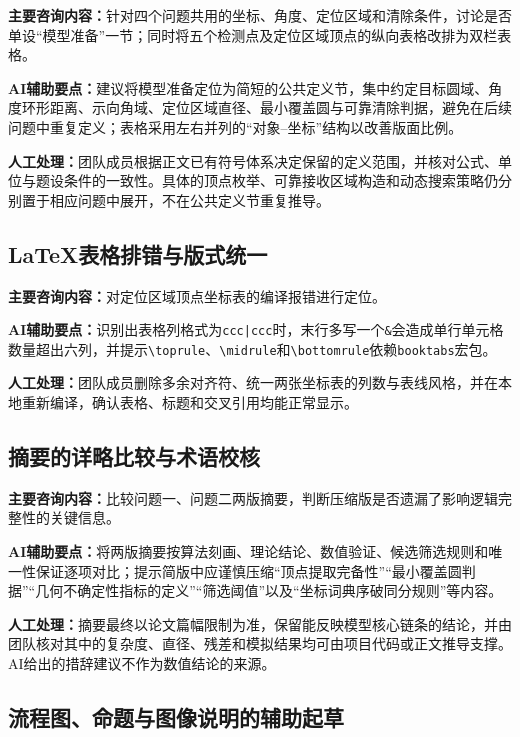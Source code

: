 \documentclass[12pt,a4paper]{article}
\begin{document}
\textbf{主要咨询内容：}针对四个问题共用的坐标、角度、定位区域和清除条件，讨论是否单设“模型准备”一节；同时将五个检测点及定位区域顶点的纵向表格改排为双栏表格。

\textbf{AI辅助要点：}建议将模型准备定位为简短的公共定义节，集中约定目标圆域、角度环形距离、示向角域、定位区域直径、最小覆盖圆与可靠清除判据，避免在后续问题中重复定义；表格采用左右并列的“对象--坐标”结构以改善版面比例。

\textbf{人工处理：}团队成员根据正文已有符号体系决定保留的定义范围，并核对公式、单位与题设条件的一致性。具体的顶点枚举、可靠接收区域构造和动态搜索策略仍分别置于相应问题中展开，不在公共定义节重复推导。

\subsection{LaTeX表格排错与版式统一}

\textbf{主要咨询内容：}对定位区域顶点坐标表的编译报错进行定位。

\textbf{AI辅助要点：}识别出表格列格式为\texttt{ccc|ccc}时，末行多写一个\texttt{\&}会造成单行单元格数量超出六列，并提示\texttt{\textbackslash toprule}、\texttt{\textbackslash midrule}和\texttt{\textbackslash bottomrule}依赖\texttt{booktabs}宏包。

\textbf{人工处理：}团队成员删除多余对齐符、统一两张坐标表的列数与表线风格，并在本地重新编译，确认表格、标题和交叉引用均能正常显示。

\subsection{摘要的详略比较与术语校核}

\textbf{主要咨询内容：}比较问题一、问题二两版摘要，判断压缩版是否遗漏了影响逻辑完整性的关键信息。

\textbf{AI辅助要点：}将两版摘要按算法刻画、理论结论、数值验证、候选筛选规则和唯一性保证逐项对比；提示简版中应谨慎压缩“顶点提取完备性”“最小覆盖圆判据”“几何不确定性指标的定义”“筛选阈值”以及“坐标词典序破同分规则”等内容。

\textbf{人工处理：}摘要最终以论文篇幅限制为准，保留能反映模型核心链条的结论，并由团队核对其中的复杂度、直径、残差和模拟结果均可由项目代码或正文推导支撑。AI给出的措辞建议不作为数值结论的来源。

\subsection{流程图、命题与图像说明的辅助起草}
\end{document}

